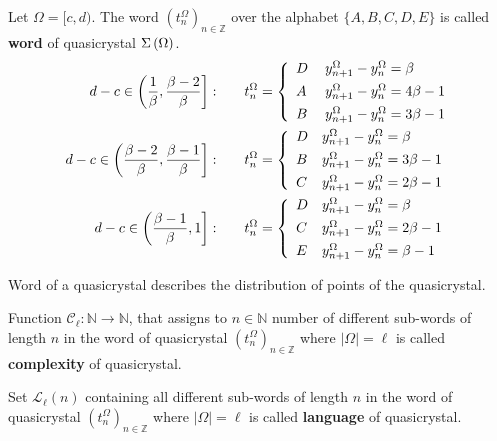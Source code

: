 \documentclass[text.tex]{subfiles}
\begin{document}
\begin{definition}
Let $\Omega = [c,d)$. The word $\left(t_n^\Omega\right)_{n\in\mathbb{Z}}$ over the alphabet $\{A,B,C,D,E\}$ is called \textbf{word} of quasicrystal $\Sigma\left(\Omega\right)$.
\begin{align*}
d-c \in \left( \frac{1}{\beta}, \frac{\beta - 2}{\beta} \right]:& \qquad
		t_n^\Omega = \left\{ \begin{array}{l l}
			D & y_{n+1}^\Omega - y_n^\Omega = \beta	\\[1.5mm]
			A~& y_{n+1}^\Omega - y_n^\Omega = 4\beta-1\\[1.5mm]
			B & y_{n+1}^\Omega - y_n^\Omega = 3\beta-1
		\end{array} \right.
\\
d-c \in \left( \frac{\beta-2}{\beta}, \frac{\beta-1}{\beta} \right]:& \qquad
		t_n^\Omega = \left\{ \begin{array}{l l}
			D & y_{n+1}^\Omega - y_n^\Omega = \beta	\\[1.5mm]
			B & y_{n+1}^\Omega - y_n^\Omega = 3\beta-1\\[1.5mm]
			C & y_{n+1}^\Omega - y_n^\Omega = 2\beta-1
		\end{array} \right.
\\
d-c \in \left( \frac{\beta-1}{\beta}, 1 \right]:& \qquad
		t_n^\Omega = \left\{ \begin{array}{l l}
			D & y_{n+1}^\Omega - y_n^\Omega = \beta	\\[1.5mm]
			C & y_{n+1}^\Omega - y_n^\Omega = 2\beta-1\\[1.5mm]
			E & y_{n+1}^\Omega - y_n^\Omega = \beta-1
		\end{array} \right.
\end{align*}
\end{definition}

\begin{remark}
Word of a quasicrystal describes the distribution of points of the quasicrystal.
\end{remark}

\begin{definition}
Function $\mathcal{C}_\ell: \mathbb{N} \to \mathbb{N}$, that assigns to $n\in\mathbb{N}$ number of different sub-words of length $n$ in the word of quasicrystal $\left(t_n^\Omega\right)_{n\in\mathbb{Z}}$ where $|\Omega| = \ell$ is called \textbf{complexity} of quasicrystal.
\end{definition}

\begin{definition}
Set $\mathcal{L}_\ell(n)$ containing all different sub-words of length $n$ in the word of quasicrystal $\left(t_n^\Omega\right)_{n\in\mathbb{Z}}$ where $|\Omega| = \ell$ is called \textbf{language} of quasicrystal.
\end{definition}
\end{document}
